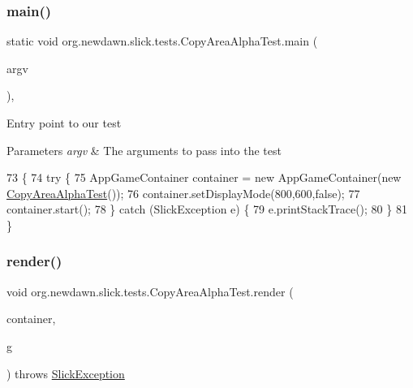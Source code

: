 \subsubsection{\texorpdfstring{main()}{main()}}
{\footnotesize\ttfamily static void org.\+newdawn.\+slick.\+tests.\+Copy\+Area\+Alpha\+Test.\+main (\begin{DoxyParamCaption}\item[{String \mbox{[}$\,$\mbox{]}}]{argv }\end{DoxyParamCaption})\hspace{0.3cm}{\ttfamily [inline]}, {\ttfamily [static]}}

Entry point to our test


\begin{DoxyParams}{Parameters}
{\em argv} & The arguments to pass into the test \\
\hline
\end{DoxyParams}

\begin{DoxyCode}
73                                            \{
74         \textcolor{keywordflow}{try} \{
75             AppGameContainer container = \textcolor{keyword}{new} AppGameContainer(\textcolor{keyword}{new} 
      \mbox{\hyperlink{classorg_1_1newdawn_1_1slick_1_1tests_1_1_copy_area_alpha_test_a95cd6685fac4e989127bcaa9c008d1c0}{CopyAreaAlphaTest}}());
76             container.setDisplayMode(800,600,\textcolor{keyword}{false});
77             container.start();
78         \} \textcolor{keywordflow}{catch} (SlickException e) \{
79             e.printStackTrace();
80         \}
81     \}
\end{DoxyCode}
\mbox{\label{classorg_1_1newdawn_1_1slick_1_1tests_1_1_copy_area_alpha_test_a861c4d706463e2ee31d15eb576ce3864}} 
\subsubsection{\texorpdfstring{render()}{render()}}
{\footnotesize\ttfamily void org.\+newdawn.\+slick.\+tests.\+Copy\+Area\+Alpha\+Test.\+render (\begin{DoxyParamCaption}\item[{\mbox{\hyperlink{classorg_1_1newdawn_1_1slick_1_1_game_container}{Game\+Container}}}]{container,  }\item[{\mbox{\hyperlink{classorg_1_1newdawn_1_1slick_1_1_graphics}{Graphics}}}]{g }\end{DoxyParamCaption}) throws \mbox{\hyperlink{classorg_1_1newdawn_1_1slick_1_1_slick_exception}{Slick\+Exception}}\hspace{0.3cm}{\ttfamily [inline]}}

